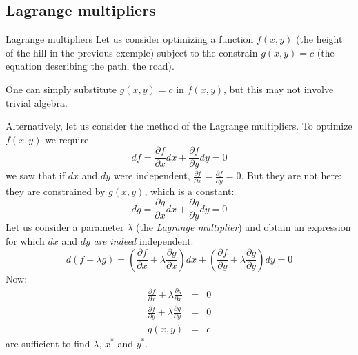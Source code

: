 \documentclass[c]{beamer}
\begin{document}
\subsection{Lagrange multipliers}
\begin{frame}[allowframebreaks]{Lagrange multipliers}
  Let us consider optimizing a function $f(x,y)$ (the height of the hill in the previous exemple) subject to the constrain $g(x,y)=c$ (the equation describing the path, the road).

  One can simply substitute $g(x,y)=c$ in $f(x,y)$, but this may not involve trivial algebra.

  Alternatively, let us consider the method of the Lagrange multipliers. To optimize $f(x,y)$ we require
  \[
    df=\frac{\partial f}{\partial x} dx +\frac{\partial f}{\partial y}dy=0
  \]
  we saw that if $dx$ and $dy$ were independent, $\frac{\partial f}{\partial x}=\frac{\partial f}{\partial y}=0$. But they are not here: they are constrained by $g(x,y)$, which is a constant:
  \[
    dg=\frac{\partial g}{\partial x} dx +\frac{\partial g}{\partial y}dy=0
  \]
  Let us consider a parameter $\lambda$ (the {\it Lagrange multiplier}) and obtain an expression for which $dx$ and $dy$ {\em are indeed} independent:
  \[
    d(f+\lambda g)=\left(\frac{\partial f}{\partial x}+\lambda \frac{\partial g}{\partial x}\right) dx +\left(\frac{\partial f}{\partial y}+\lambda \frac{\partial g}{\partial y}\right)dy=0
  \]
  Now:
  \begin{eqnarray*}
    \frac{\partial f}{\partial x}+\lambda \frac{\partial g}{\partial x} &=&0\\
    \frac{\partial f}{\partial y}+\lambda \frac{\partial g}{\partial y} &=&0\\
    g(x,y)&=&c
  \end{eqnarray*}
  are sufficient to find $\lambda$, $x^*$ and $y^*$.

\end{frame}
\end{document}
